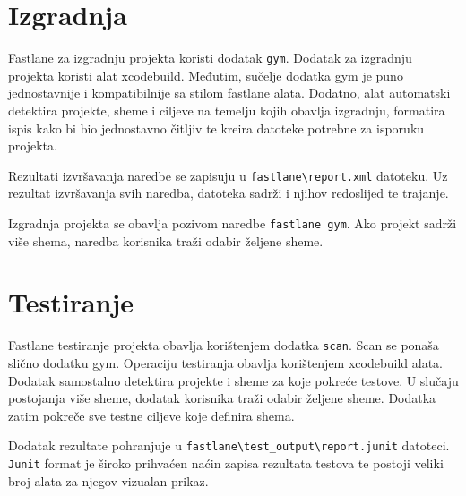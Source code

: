 \documentclass[times, utf8, diplomski, numeric]{fer}
\begin{document}
\begin{appendices}
\section{Izgradnja}

Fastlane za izgradnju projekta koristi dodatak \verb|gym|\citep{fastlane:gym}. Dodatak za izgradnju projekta koristi alat xcodebuild. Međutim, sučelje dodatka gym je puno jednostavnije i kompatibilnije sa stilom fastlane alata. Dodatno, alat automatski detektira projekte, sheme i ciljeve na temelju kojih obavlja izgradnju, formatira ispis kako bi bio jednostavno čitljiv te kreira datoteke potrebne za isporuku projekta.

Rezultati izvršavanja naredbe se zapisuju u \verb|fastlane\report.xml| datoteku. Uz rezultat izvršavanja svih naredba, datoteka sadrži i njihov redoslijed te trajanje.

Izgradnja projekta se obavlja pozivom naredbe \verb|fastlane gym|. Ako projekt sadrži više shema, naredba korisnika traži odabir željene sheme.

\section{Testiranje}

Fastlane testiranje projekta obavlja korištenjem dodatka \verb|scan|\citep{fastlane:scan}. Scan se ponaša slično dodatku gym. Operaciju testiranja obavlja korištenjem xcodebuild alata. Dodatak samostalno detektira projekte i sheme za koje pokreće testove. U slučaju postojanja više sheme, dodatak korisnika traži odabir željene sheme. Dodatka zatim pokreče sve testne ciljeve koje definira shema.

Dodatak rezultate pohranjuje u \verb|fastlane\test_output\report.junit| datoteci. \verb|Junit| format je široko prihvaćen naćin zapisa rezultata testova te postoji veliki broj alata za njegov vizualan prikaz.

\end{appendices}
\end{document}
